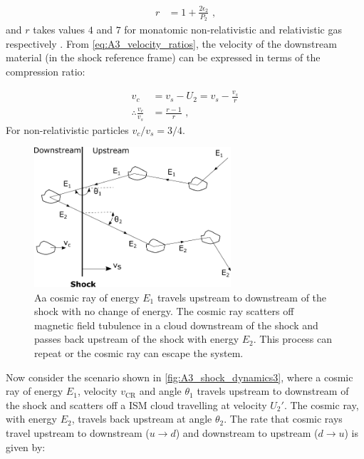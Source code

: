 \begin{equation}
    \begin{aligned}
        r&=1+\frac{2\epsilon_2}{P_2}\text{ ,}
    \end{aligned}
\end{equation}
\noindent and $r$ takes values $4$ and $7$ for monatomic non-relativistic and relativistic gas respectively  \citep{1983RPPh...46..973D}.
\newpar 
From \autoref{eq:A3_velocity_ratios}, the velocity of the downstream material (in the shock reference frame) can be expressed in terms of the compression ratio:

\begin{equation}
    \begin{aligned}
        v_c &=v_s-U_2=v_s-\frac{v_s}{r} \\
        \therefore \frac{v_c}{v_s}&=\frac{r-1}{r}\text{ ,}
    \end{aligned} \label{eq:down_upstream_v_ratio}
\end{equation}
\noindent For non-relativistic particles ${v_c}/{v_s}=3/4$.
\begin{figure}
	\centering
	\includegraphics[width=0.65\textwidth]{A3_Diffusive_Shock_Acceleration/Images/dsa.pdf}
	\caption{Aa cosmic ray of energy $E_1$ travels upstream to downstream of the shock with no change of energy. The cosmic ray scatters off magnetic field tubulence in a cloud downstream of the shock and passes back upstream of the shock with energy $E_2$. This process can repeat or the cosmic ray can escape the system.}
	\label{fig:A3_shock_dynamics3}
\end{figure}
\newpar 
Now consider the scenario shown in \autoref{fig:A3_shock_dynamics3}, where a cosmic ray of energy $E_1$, velocity $v_\text{CR}$ and angle $\theta_1$ travels upstream to downstream of the shock and scatters off a ISM cloud travelling at velocity $U_2'$. The cosmic ray, with energy $E_2$, travels back upstream at angle $\theta_2$. The rate that cosmic rays travel upstream to downstream ($u\rightarrow d$) and downstream to upstream ($d\rightarrow u$) is given by:


